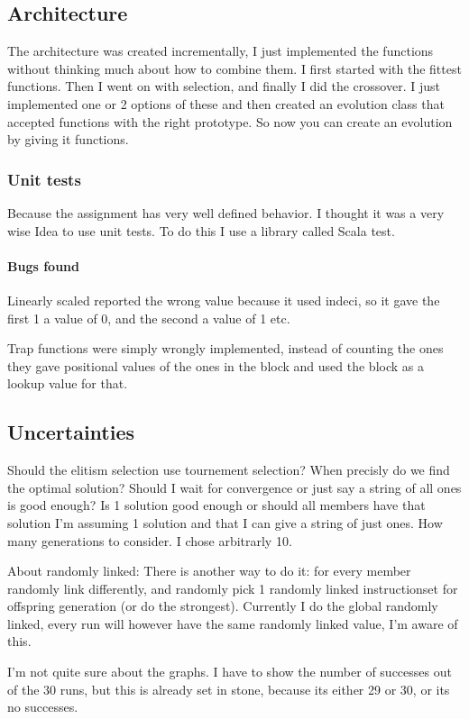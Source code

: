 \documentclass{article}
\begin{document}
\subsection{Architecture}
The architecture was created incrementally, I just implemented the functions
without thinking much about how to combine them.  I first started with the
fittest functions. Then I went on with selection, and finally I did the
crossover.
I just implemented one or 2 options of these and then created an evolution
class that accepted functions with the right prototype. So now you can
create an evolution by giving it functions.

\subsubsection{Unit tests}
Because the assignment has very well defined behavior. I thought it was
a very wise Idea to use unit tests. To do this I use a library called
Scala test.

\paragraph{Bugs found}
Linearly scaled reported the wrong value because it used indeci, so it
gave the first 1 a value of 0, and the second a value of 1 etc.

Trap functions were simply wrongly implemented, instead of counting the
ones they gave positional values of the ones in the block and used the
block as a lookup value for that.
\subsection{Uncertainties}
Should the elitism selection use tournement selection?
When precisly do we find the optimal solution?
	Should I wait for convergence or just say a string
	of all ones is good enough?
	Is 1 solution good enough or should all members have
	that solution
	I'm assuming 1 solution and that I can give a string
	of just ones.
How many generations to consider. I chose arbitrarly 10.

About randomly linked:
	There is another way to do it: for every member randomly link
	differently, and randomly pick 1 randomly linked instructionset
	for offspring generation (or do the strongest).
	Currently I do the global randomly linked, every run will however
	have the same randomly linked value, I'm aware of this.

I'm not quite sure about the graphs. I have to show the number of successes
out of the 30 runs, but this is already set in stone, because its either
29 or 30, or its no successes.
\end{document}
